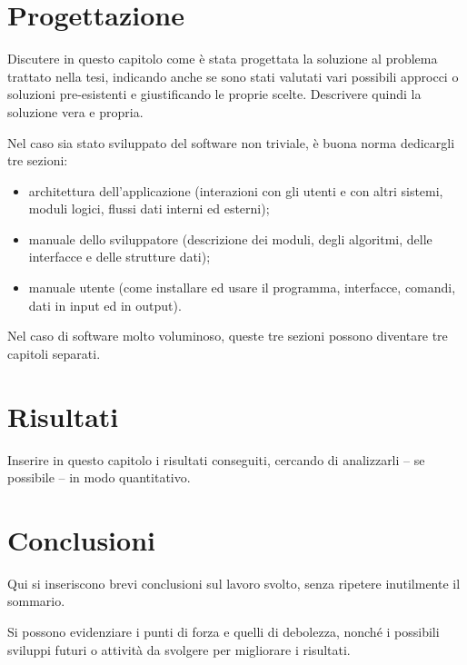 \documentclass[cucitura%
]{toptesi}
\begin{document}


\chapter{Progettazione}

Discutere in questo capitolo come è stata progettata la soluzione al problema trattato nella tesi, indicando anche se sono stati valutati vari possibili approcci o soluzioni pre-esistenti e giustificando le proprie scelte. Descrivere quindi la soluzione vera e propria.

Nel caso sia stato sviluppato del software non triviale, è buona norma dedicargli tre sezioni:
\begin{itemize}
\item architettura dell'applicazione (interazioni con gli utenti e con altri sistemi, moduli logici, flussi dati interni ed esterni);
\item manuale dello sviluppatore (descrizione dei moduli, degli algoritmi, delle interfacce e delle strutture dati);
\item manuale utente (come installare ed usare il programma, interfacce, comandi, dati in input ed in output).
\end{itemize}
Nel caso di software molto voluminoso, queste tre sezioni possono diventare tre capitoli separati.

\chapter{Risultati}

Inserire in questo capitolo i risultati conseguiti, cercando di analizzarli -- se possibile -- in modo quantitativo.


\chapter{Conclusioni}

Qui si inseriscono brevi conclusioni sul lavoro svolto, senza ripetere inutilmente il sommario.

Si possono evidenziare i punti di forza e quelli di debolezza, nonché i possibili sviluppi futuri o attività da svolgere per migliorare i risultati.



\end{document}
